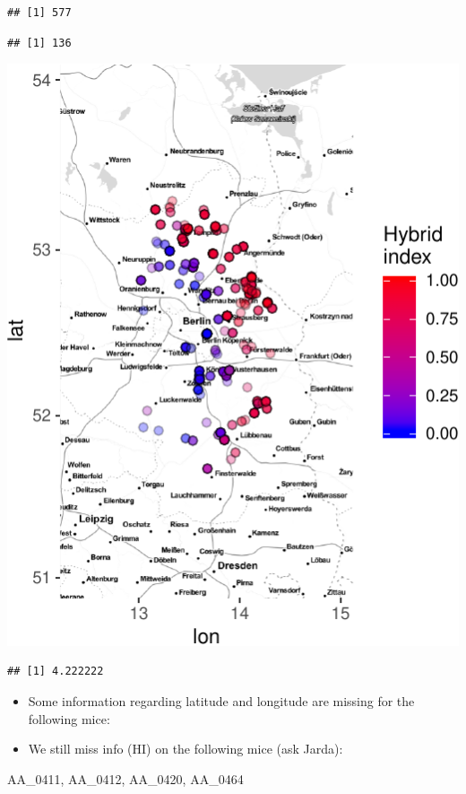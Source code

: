 \documentclass[]{article}
\begin{document}
\begin{verbatim}
## [1] 577
\end{verbatim}

\begin{verbatim}
## [1] 136
\end{verbatim}

\includegraphics{Data_Analysis_Alice_files/figure-latex/generalstats-1.pdf}

\begin{verbatim}
## [1] 4.222222
\end{verbatim}

\begin{itemize}
\item
  Some information regarding latitude and longitude are missing for the
  following mice:
\item
  We still miss info (HI) on the following mice (ask Jarda):
\end{itemize}

AA\_0411, AA\_0412, AA\_0420, AA\_0464
\end{document}

